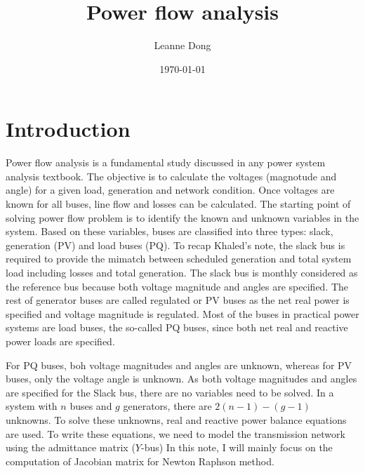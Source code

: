 \documentclass[11pt, oneside, reqno]{amsart}
\title{Power flow analysis
}
\author{Leanne Dong}
\date{\today}
\numberwithin{equation}{section}
\theoremstyle{plain}%
\theoremstyle{definition}
\theoremstyle{remark}
\begin{document}
	\maketitle

\section{Introduction}
	Power flow analysis is a fundamental study discussed in any power system analysis textbook. The objective is to calculate the voltages (magnotude and angle) for a given load, generation and network condition. Once voltages are known for all buses, line flow and losses can be calculated. The starting point of solving power flow problem is to identify the known and unknown variables in the system. Based on these variables, buses are classified into three types: slack, generation (PV) and load buses (PQ). To recap Khaled's note, the slack bus is required to provide the mimatch between scheduled generation and total system load including losses and total generation. The slack bus is monthly considered as the reference bus because both voltage magnitude and angles are specified. The rest of generator buses are called regulated or PV buses as the net real power is specified and voltage magnitude is regulated. Most of the buses in practical power systems are load buses, the so-called PQ buses, since both net real and reactive power loads are specified.

For PQ buses, boh voltage magnitudes and angles are unknown, whereas for PV buses, only the voltage angle is unknown. As both voltage magnitudes and angles are specified for the Slack bus, there are no variables need to be solved. In a system with $n$ buses and $g$ generators, there are $2(n-1)-(g-1)$ unknowns. To solve these unknowns, real and reactive power balance equations are used. To write these equations, we need to model the transmission network using the admittance matrix ($Y$-bus)
In this note, I will mainly focus on the computation
of Jacobian matrix for Newton Raphson method.
\end{document}
